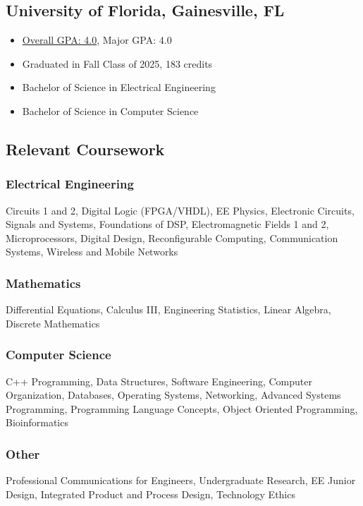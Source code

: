 \documentclass{article}
\newcommand\halftextbox[1]{%
  \parbox[t]{.475\textwidth}{#1}%
}
\newcommand\spacetextbox[1]{%
  \parbox{.05\textwidth}{#1}%
}
\newenvironment{CustomItemize}
{ \begin{itemize}[leftmargin=1em]
    \setlength{\itemsep}{0pt}
    \setlength{\parskip}{0pt}
    \setlength{\parindent}{0pt}
    \setlength{\parsep}{0pt}     }
{ \end{itemize}                  }
\begin{document}
\noindent
\halftextbox{
\begin{raggedright}
\subsection{University of Florida,  Gainesville, FL}
\begin{CustomItemize}
\item \underline{Overall GPA: 4.0}, Major GPA: 4.0
\item Graduated in Fall Class of 2025, 183 credits
\item Bachelor of Science in Electrical Engineering
\item Bachelor of Science in Computer Science
\end{CustomItemize}

\subsection{Relevant Coursework}
\subsubsection{Electrical Engineering}
Circuits 1 and 2,
Digital Logic (FPGA/VHDL),
EE Physics,
Electronic Circuits,
Signals and Systems,
Foundations of DSP,
Electromagnetic Fields 1 and 2,
Microprocessors,
Digital Design,
Reconfigurable Computing,
Communication Systems,
Wireless and Mobile Networks
\end{raggedright}
}
\spacetextbox{\hfil\hfil}
\halftextbox{
\begin{raggedright}
\subsubsection{Mathematics}
Differential Equations,
Calculus III,
Engineering Statistics, 
Linear Algebra,
Discrete Mathematics
\subsubsection{Computer Science}
C++ Programming,
Data Structures,
Software Engineering,
Computer Organization,
Databases,
Operating Systems,
Networking,
Advanced Systems Programming,
Programming Language Concepts,
Object Oriented Programming,
Bioinformatics

\subsubsection{Other}
Professional Communications for Engineers,
Undergraduate Research,
EE Junior Design,
Integrated Product and Process Design,
Technology Ethics

\end{raggedright}
}
\end{document}
